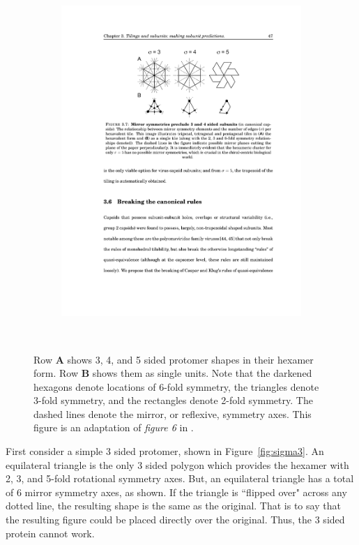 \documentclass[12pt,letter]{article}
\begin{document}
\begin{figure}[h]
\begin{subfigure}[h]{.2\textwidth}
		\includegraphics[width=\textwidth]{sigma5.pdf}
		\caption{}
		\label{fig:sigma5}
	\end{subfigure}
	\\
	\begin{minipage}[h]{.85\textwidth}
		\begin{footnotesize}
		Row \textbf{A} shows 3, 4, and 5 sided protomer shapes in their hexamer form. Row \textbf{B} shows them as single units. Note that the darkened hexagons denote locations of 6-fold symmetry, the triangles denote 3-fold symmetry, and the rectangles denote 2-fold symmetry. The dashed lines denote the mirror, or reflexive, symmetry axes. This figure is an adaptation of \textit{figure 6} in \cite{Mannige:2008}.
		\end{footnotesize}
	\end{minipage}
	\label{fig:mirror}
\end{figure}

First consider a simple 3 sided protomer, shown in Figure~\ref{fig:sigma3}. An equilateral triangle is the only 3 sided polygon which provides the hexamer with 2, 3, and 5-fold rotational symmetry axes. But, an equilateral triangle has a total of 6 mirror symmetry axes, as shown. If the triangle is ``flipped over" across any dotted line, the resulting shape is the same as the original. That is to say that the resulting figure could be placed directly over the original. Thus, the 3 sided protein cannot work.
\end{document}
